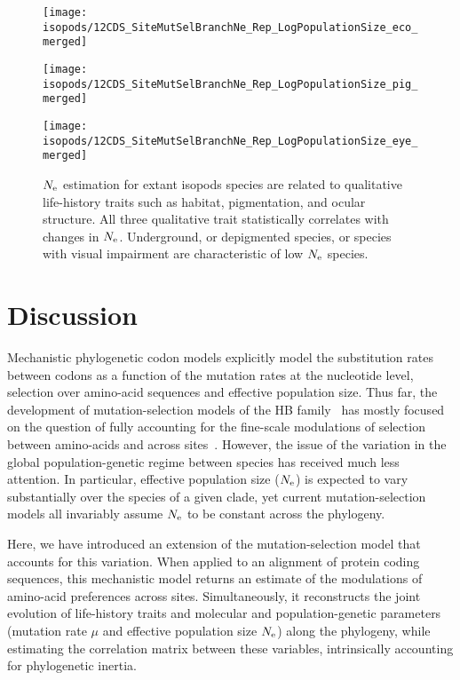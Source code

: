 \begin{figure}[h]
    \centering
    \begin{minipage}{0.32\linewidth}
        \texttt{[image: isopods/12CDS\_SiteMutSelBranchNe\_Rep\_LogPopulationSize\_eco\_merged]}
    \end{minipage} \hfill
    \begin{minipage}{0.32\linewidth}
        \texttt{[image: isopods/12CDS\_SiteMutSelBranchNe\_Rep\_LogPopulationSize\_pig\_merged]}
    \end{minipage} \hfill
    \begin{minipage}{0.32\linewidth}
        \texttt{[image: isopods/12CDS\_SiteMutSelBranchNe\_Rep\_LogPopulationSize\_eye\_merged]}
    \end{minipage}
    \caption[$\Ne$ as a function of traits in isopods]{
    $\Ne$ estimation for extant isopods species are related to qualitative life-history traits such as habitat, pigmentation, and ocular structure.
    All three qualitative trait statistically correlates with changes in $\Ne$.
    Underground, or depigmented species, or species with visual impairment are characteristic of low $\Ne$ species.}
    \label{fig:isopods_correlation}
\end{figure}


\section{Discussion}
\label{sec:Discussion}
Mechanistic phylogenetic \gls{codon} models explicitly model the \gls{substitution} rates between \glspl{codon} as a function of the mutation rates at the nucleotide level, selection over amino-acid sequences and \gls{effective population size}.
Thus far, the development of mutation-selection models of the \acrshort{HB} family~\citep{Rodrigue2010, Tamuri2012} has mostly focused on the question of fully accounting for the fine-scale modulations of selection between amino-acids and across sites~\citep{Rodrigue2010, Tamuri2012}.
However, the issue of the variation in the global population-genetic regime between species has received much less attention.
In particular, \gls{effective population size} ($\Ne$) is expected to vary substantially over the species of a given clade, yet current mutation-selection models all invariably assume $\Ne$ to be constant across the phylogeny.

Here, we have introduced an extension of the mutation-selection model that accounts for this variation.
When applied to an alignment of protein coding sequences, this mechanistic model returns an estimate of the modulations of amino-acid preferences across sites.
Simultaneously, it reconstructs the joint evolution of life-history traits and molecular and population-genetic parameters (mutation rate $\mu$ and \gls{effective population size} $\Ne$) along the phylogeny, while estimating the correlation matrix between these variables, intrinsically accounting for phylogenetic inertia.

